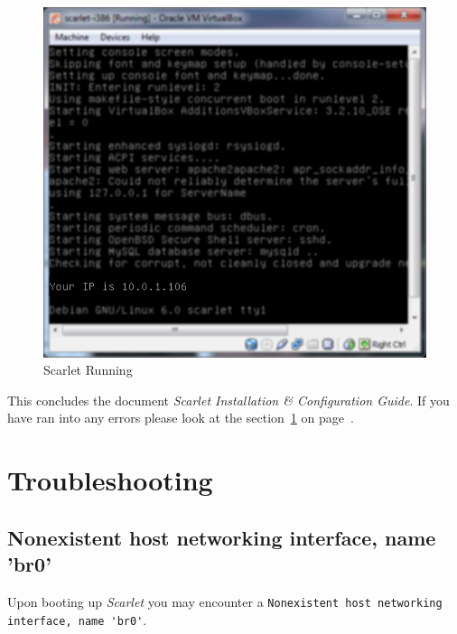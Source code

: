 \documentclass[pdftex,11pt,letterpaper]{article}
\begin{document}
\begin{enumerate}
    \begin{figure}[H]
        \begin{center}
        \leavevmode
            \includegraphics[]{scarlet_images/scarlet_running_blurred.png}
        \end{center}
        \caption{Scarlet Running}
        \label{fig:scarlet_running}
    \end{figure}

\end{enumerate}

This concludes the document \emph{Scarlet Installation \& Configuration Guide}.  If you have ran into any errors please look at the section~\ref{sec:troubleshooting} on page~\pageref{sec:troubleshooting}.

\section{Troubleshooting}
\label{sec:troubleshooting}

\subsection{Nonexistent host networking interface, name 'br0'}

Upon booting up \textit{Scarlet} you may encounter a \verb+Nonexistent host networking interface, name 'br0'+.
\end{document}
